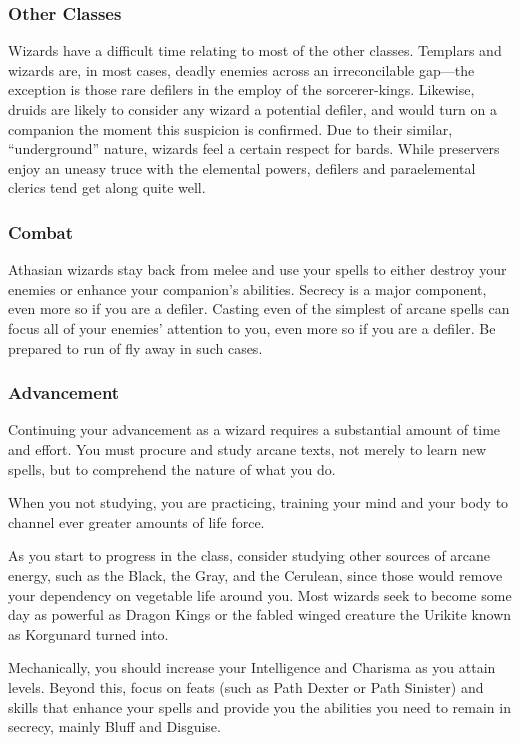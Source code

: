 \subsubsection{Other Classes}

Wizards have a difficult time relating to most of the other classes. Templars and wizards are, in most cases, deadly enemies across an irreconcilable gap---the exception is those rare defilers in the employ of the sorcerer-kings. Likewise, druids are likely to consider any wizard a potential defiler, and would turn on a companion the moment this suspicion is confirmed. Due to their similar, ``underground'' nature, wizards feel a certain respect for bards. While preservers enjoy an uneasy truce with the elemental powers, defilers and paraelemental clerics tend get along quite well.

\subsubsection{Combat}

Athasian wizards stay back from melee and use your spells to either destroy your enemies or enhance your companion's abilities. Secrecy is a major component, even more so if you are a defiler. Casting even of the simplest of arcane spells can focus all of your enemies' attention to you, even more so if you are a defiler. Be prepared to run of fly away in such cases.

\subsubsection{Advancement}

Continuing your advancement as a wizard requires a substantial amount of time and effort. You must procure and study arcane texts, not merely to learn new spells, but to comprehend the nature of what you do.

When you not studying, you are practicing, training your mind and your body to channel ever greater amounts of life force.

As you start to progress in the class, consider studying other sources of arcane energy, such as the Black, the Gray, and the Cerulean, since those would remove your dependency on vegetable life around you. Most wizards seek to become some day as powerful as Dragon Kings or the fabled winged creature the Urikite known as Korgunard turned into.

Mechanically, you should increase your Intelligence and Charisma as you attain levels. Beyond this, focus on feats (such as Path Dexter or Path Sinister) and skills that enhance your spells and provide you the abilities you need to remain in secrecy, mainly Bluff and Disguise.

